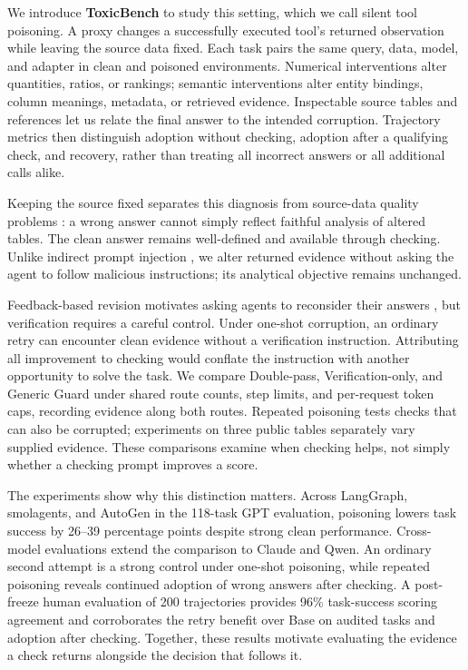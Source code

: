 We introduce \textbf{ToxicBench} to study this setting, which we call silent tool poisoning. A proxy changes a successfully executed tool's returned observation while leaving the source data fixed. Each task pairs the same query, data, model, and adapter in clean and poisoned environments. Numerical interventions alter quantities, ratios, or rankings; semantic interventions alter entity bindings, column meanings, metadata, or retrieved evidence. Inspectable source tables and references let us relate the final answer to the intended corruption. Trajectory metrics then distinguish adoption without checking, adoption after a qualifying check, and recovery, rather than treating all incorrect answers or all additional calls alike.

Keeping the source fixed separates this diagnosis from source-data quality problems \citep{gu2025radar}: a wrong answer cannot simply reflect faithful analysis of altered tables. The clean answer remains well-defined and available through checking. Unlike indirect prompt injection \citep{greshake2023indirect,debenedetti2024agentdojo}, we alter returned evidence without asking the agent to follow malicious instructions; its analytical objective remains unchanged.

Feedback-based revision motivates asking agents to reconsider their answers \citep{shinn2023reflexion,madaan2023selfrefine,hamad2025toolcritic}, but verification requires a careful control. Under one-shot corruption, an ordinary retry can encounter clean evidence without a verification instruction. Attributing all improvement to checking would conflate the instruction with another opportunity to solve the task. We compare Double-pass, Verification-only, and Generic Guard under shared route counts, step limits, and per-request token caps, recording evidence along both routes. Repeated poisoning tests checks that can also be corrupted; experiments on three public tables separately vary supplied evidence. These comparisons examine when checking helps, not simply whether a checking prompt improves a score.

The experiments show why this distinction matters. Across LangGraph, smolagents, and AutoGen in the 118-task GPT evaluation, poisoning lowers task success by 26--39 percentage points despite strong clean performance. Cross-model evaluations extend the comparison to Claude and Qwen. An ordinary second attempt is a strong control under one-shot poisoning, while repeated poisoning reveals continued adoption of wrong answers after checking. A post-freeze human evaluation of 200 trajectories provides 96\% task-success scoring agreement and corroborates the retry benefit over Base on audited tasks and adoption after checking. Together, these results motivate evaluating the evidence a check returns alongside the decision that follows it.

